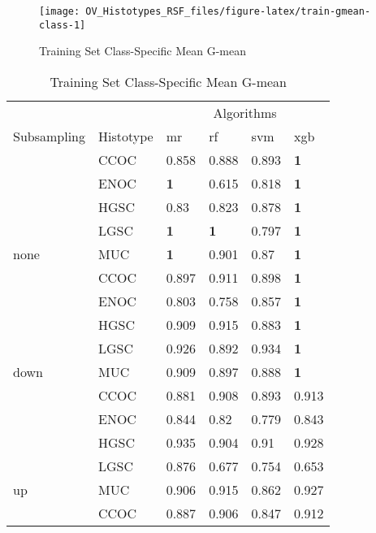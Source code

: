 \documentclass[
]{report}
\begin{document}
\begin{figure}[H]

{\centering \texttt{[image: OV\_Histotypes\_RSF\_files/figure-latex/train-gmean-class-1]} 

}

\caption{Training Set Class-Specific Mean G-mean}\label{fig:train-gmean-class}
\end{figure}

\begin{table}

\caption{\label{tab:train-gmean-class-table}Training Set Class-Specific Mean G-mean}
\centering
\begin{tabular}[t]{l|l|l|l|l|l}
\hline
\multicolumn{2}{c|}{ } & \multicolumn{4}{c}{Algorithms} \\
\cline{3-6}
Subsampling & Histotype & mr & rf & svm & xgb\\
\hline
 & CCOC & 0.858 & 0.888 & 0.893 & \textbf{1}\\
\cline{2-6}
 & ENOC & \textbf{1} & 0.615 & 0.818 & \textbf{1}\\
\cline{2-6}
 & HGSC & 0.83 & 0.823 & 0.878 & \textbf{1}\\
\cline{2-6}
 & LGSC & \textbf{1} & \textbf{1} & 0.797 & \textbf{1}\\
\cline{2-6}
\multirow{-5}{*}{\raggedright\arraybackslash none} & MUC & \textbf{1} & 0.901 & 0.87 & \textbf{1}\\
\cline{1-6}
 & CCOC & 0.897 & 0.911 & 0.898 & \textbf{1}\\
\cline{2-6}
 & ENOC & 0.803 & 0.758 & 0.857 & \textbf{1}\\
\cline{2-6}
 & HGSC & 0.909 & 0.915 & 0.883 & \textbf{1}\\
\cline{2-6}
 & LGSC & 0.926 & 0.892 & 0.934 & \textbf{1}\\
\cline{2-6}
\multirow{-5}{*}{\raggedright\arraybackslash down} & MUC & 0.909 & 0.897 & 0.888 & \textbf{1}\\
\cline{1-6}
 & CCOC & 0.881 & 0.908 & 0.893 & 0.913\\
\cline{2-6}
 & ENOC & 0.844 & 0.82 & 0.779 & 0.843\\
\cline{2-6}
 & HGSC & 0.935 & 0.904 & 0.91 & 0.928\\
\cline{2-6}
 & LGSC & 0.876 & 0.677 & 0.754 & 0.653\\
\cline{2-6}
\multirow{-5}{*}{\raggedright\arraybackslash up} & MUC & 0.906 & 0.915 & 0.862 & 0.927\\
\cline{1-6}
 & CCOC & 0.887 & 0.906 & 0.847 & 0.912\\

\end{tabular}
\end{table}
\end{document}
